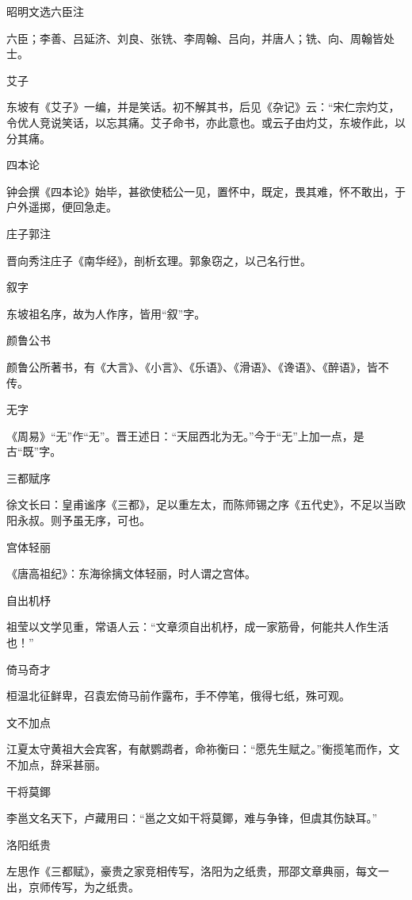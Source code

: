 \documentclass[a4paper,12pt,UTF8,twoside]{ctexbook}
\begin{document}
    昭明文选六臣注
    
    六臣；李善、吕延济、刘良、张铣、李周翰、吕向，并唐人；铣、向、周翰皆处士。
    
    艾子
    
    东坡有《艾子》一编，并是笑话。初不解其书，后见《杂记》云：“宋仁宗灼艾，令优人竞说笑话，以忘其痛。艾子命书，亦此意也。或云子由灼艾，东坡作此，以分其痛。
    
    四本论
    
    钟会撰《四本论》始毕，甚欲使嵇公一见，置怀中，既定，畏其难，怀不敢出，于户外遥掷，便回急走。
    
    庄子郭注
    
    晋向秀注庄子《南华经》，剖析玄理。郭象窃之，以己名行世。
    
    叙字
    
    东坡祖名序，故为人作序，皆用“叙”字。
    
    颜鲁公书
    
    颜鲁公所著书，有《大言》、《小言》、《乐语》、《滑语》、《谗语》、《醉语》，皆不传。
    
    无字
    
    《周易》“无”作“无”。晋王述日：“天屈西北为无。”今于“无”上加一点，是古“既”字。
    
    三都赋序
    
    徐文长曰：皇甫谧序《三都》，足以重左太，而陈师锡之序《五代史》，不足以当欧阳永叔。则予虽无序，可也。
    
    宫体轻丽
    
    《唐高祖纪》：东海徐摛文体轻丽，时人谓之宫体。
    
    自出机杼
    
    祖莹以文学见重，常语人云：“文章须自出机杼，成一家筋骨，何能共人作生活也！”
    
    倚马奇才
    
    桓温北征鲜卑，召袁宏倚马前作露布，手不停笔，俄得七纸，殊可观。
    
    文不加点
    
    江夏太守黄祖大会宾客，有献鹦鹉者，命祢衡曰：“愿先生赋之。”衡揽笔而作，文不加点，辞采甚丽。
    
    干将莫鎁
    
    李邕文名天下，卢藏用曰：“邕之文如干将莫鎁，难与争锋，但虞其伤缺耳。”
    
    洛阳纸贵
    
    左思作《三都赋》，豪贵之家竞相传写，洛阳为之纸贵，邢邵文章典丽，每文一出，京师传写，为之纸贵。
    
\end{document}
